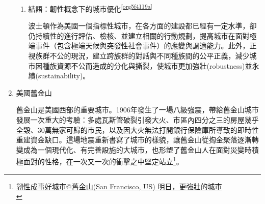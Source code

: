 \documentclass[a4paper,12pt]{article}
\begin{document}
\begin{enumerate}
\begin{enumerate}
\item 結語：韌性概念下的城市優化\textsuperscript{\ref{org5f4119a}}
\label{sec:org796c4df}

波士頓作為美國一個指標性城市，在各方面的建設都已經有一定水準，卻仍持續性的進行評估、檢核、並建立相關的行動規劃，提高城市在面對極端事件（包含極端天候與突發性社會事件）的應變與調適能力。此外，正視族群不公的現況，建立跨族群的對話與不同種族間的公平正義，減少城市因種族資源不公而造成的分化與撕裂，使城市更加強壯(robustness)並永續(sustainability)。\\
\end{enumerate}

\item 美國舊金山
\label{sec:org8e33a92}

舊金山是美國西部的重要城市。1906年發生了一場八級強震，帶給舊金山城市發展一次重大的考驗：多處瓦斯管破裂引發大火、市區內四分之三的房屋幾乎全毀、30萬無家可歸的市民，以及因大火無法打開銀行保險庫所導致的即時性重建資金缺口。這場地震重新書寫了城市的樣貌，讓舊金山從掏金聚落逐漸轉變成為一個現代化、有完善設施的大城市，也形塑了舊金山人在面對災變時積極面對的性格，在一次又一次的衝擊之中堅定站立\footnote{\href{https://eyesonplace.net/2018/12/31/10103/}{韌性成事好城市@舊金山(San Francisco, US) 明日，更強壯的城市}\\\label{orge4cb785}}。\\


\end{enumerate}
\end{document}
